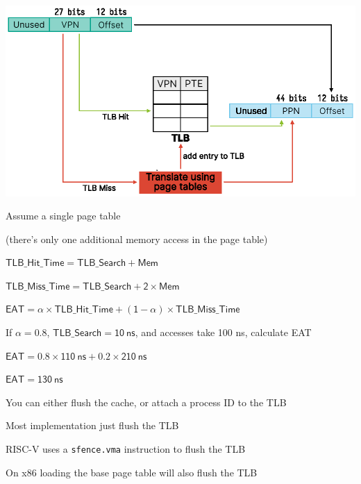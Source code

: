   \begin{slide}


    \centering
    \includegraphics{tlb.eps}

  \end{slide}

  \begin{slide}


    Assume a single page table
    
    \leftspace{}(there's only one additional memory access in the page table)
    \medskip

    $\mathsf{TLB\_Hit\_Time = TLB\_Search + Mem}$

    $\mathsf{TLB\_Miss\_Time = TLB\_Search + 2 \times Mem}$

    $\mathsf{EAT = \alpha \times TLB\_Hit\_Time + (1 - \alpha) \times TLB\_Miss\_Time}$
    \medskip

    If $\mathsf{\alpha = 0.8}$, $\mathsf{TLB\_Search = 10\ ns}$, and accesses take 100 ns, calculate EAT

    \leftspace{}$\mathsf{EAT = 0.8 \times 110\ ns + 0.2 \times 210\ ns}$

    \leftspace{}$\mathsf{EAT = 130\ ns}$

  \end{slide}

  \begin{slide}


    You can either flush the cache, or attach a process ID to the TLB
    \medskip

    Most implementation just flush the TLB

    \leftspace{}RISC-V uses a \texttt{sfence.vma} instruction to flush the TLB
    \medskip

    On x86 loading the base page table will also flush the TLB

  \end{slide}

